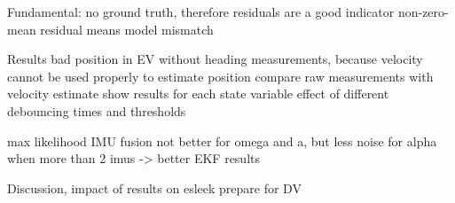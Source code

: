 Fundamental: no ground truth, therefore residuals are a good indicator
non-zero-mean residual means model mismatch~\cite[p.~158]{AlexanderWischnewski.2019}

Results
bad position in EV without heading measurements, because velocity cannot be used properly to estimate position
compare raw measurements with velocity estimate
show results for each state variable
effect of different debouncing times and thresholds

max likelihood IMU fusion not better for omega and a, but less noise for alpha when more than 2 imus -> better EKF results


Discussion, impact of results on esleek
prepare for DV
